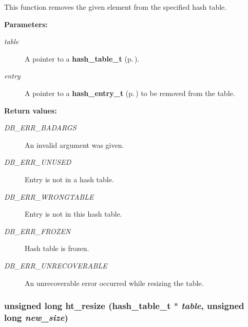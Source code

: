  This function removes the given element from the specified hash table.\begin{Desc}
\item[{\bf Parameters: }]\par
\begin{description}
\item[
{\em table}]A pointer to a {\bf hash\_\-table\_\-t} {\rm (p.\,\pageref{group__dbprim__hash_a0})}. \item[
{\em entry}]A pointer to a {\bf hash\_\-entry\_\-t} {\rm (p.\,\pageref{group__dbprim__hash_a1})} to be removed from the table.\end{description}
\end{Desc}
\begin{Desc}
\item[{\bf Return values: }]\par
\begin{description}
\item[
{\em DB\_\-ERR\_\-BADARGS}]An invalid argument was given. \item[
{\em DB\_\-ERR\_\-UNUSED}]Entry is not in a hash table. \item[
{\em DB\_\-ERR\_\-WRONGTABLE}]Entry is not in this hash table. \item[
{\em DB\_\-ERR\_\-FROZEN}]Hash table is frozen. \item[
{\em DB\_\-ERR\_\-UNRECOVERABLE}]An unrecoverable error occurred while resizing the table. \end{description}
\end{Desc}
\subsubsection{\setlength{\rightskip}{0pt plus 5cm}unsigned long ht\_\-resize ({\bf hash\_\-table\_\-t} $\ast$ {\em table}, unsigned long {\em new\_\-size})}\label{group__dbprim__hash_a13}




